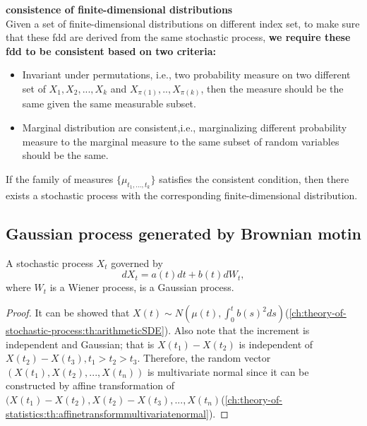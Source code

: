 \begin{refsection}
\begin{mdframed}
\textbf{consistence of finite-dimensional distributions}\\
Given a set of finite-dimensional distributions on different index set, to make sure that these fdd are derived from the same stochastic process, \textbf{we require these fdd to be consistent based on two criteria:}\cite[lec 4]{Holmes-Cerfon2015applied}
\begin{itemize}
    \item Invariant under permutations, i.e., two probability measure on two different set of $X_1,X_2,...,X_k$ and $X_{\pi(1)},..,X_{\pi(k)}$, then the measure should be the same given the same measurable subset.
    \item Marginal distribution are consistent,i.e., marginalizing different probability measure to the marginal measure to the same subset of random variables should be the same.
\end{itemize}
\end{mdframed}

\begin{theorem} If the family of measures $\{\mu_{t_1,...,t_k}\}$ satisfies the consistent condition, then there exists a stochastic process with the corresponding finite-dimensional distribution.
\end{theorem}


\subsection{Gaussian process generated by Brownian motin}
\begin{lemma}\label{ch:theory-of-stochastic-process:th:GaussianprocessSDE}
	A stochastic process $X_t$ governed by 
	$$dX_t = a(t)dt + b(t)dW_t,$$
	where $W_t$ is a Wiener process, is a Gaussian process.
\end{lemma}
\begin{proof}
	It can be showed that $X(t) \sim N(\mu(t),\int_0^t b(s)^2ds)$(\autoref{ch:theory-of-stochastic-process:th:arithmeticSDE}). Also note that the increment is independent and Gaussian; that is $X(t_1)-X(t_2)$ is independent of $X(t_2)-X(t_3),t_1>t_2>t_3$. Therefore, the random vector $(X(t_1),X(t_2),...,X(t_n))$ is multivariate normal since it can be constructed by affine transformation of $(X(t_1)-X(t_2),X(t_2)-X(t_3),..., X(t_n)$(\autoref{ch:theory-of-statistics:th:affinetransformmultivariatenormal}).
\end{proof}



\end{refsection}
